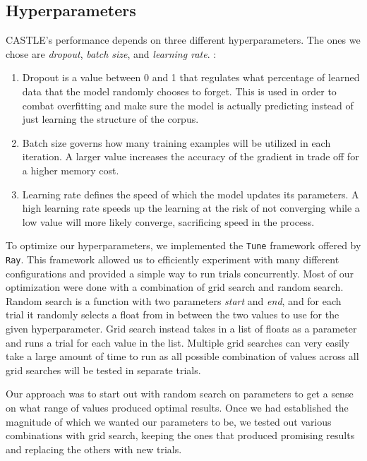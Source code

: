 \documentclass[nofilelist]{cslthse-msc}
\begin{document}
\subsection{Hyperparameters}
CASTLE's performance depends on three different hyperparameters. The ones we chose are \textit{dropout}, \textit{batch size}, and \textit{learning rate}. \citep{hyperparameters}:
\begin{enumerate}
    \item Dropout is a value between 0 and 1 that regulates what percentage of learned data that the model randomly chooses to forget. This is used in order to combat overfitting and make sure the model is actually predicting instead of just learning the structure of the corpus.
    \item  Batch size governs how many training examples will be utilized in each iteration. A larger value increases the accuracy of the gradient in trade off for a higher memory cost.
    \item  Learning rate defines the speed of which the model updates its parameters. A high learning rate speeds up the learning at the risk of not converging while a low value will more likely converge, sacrificing speed in the process.
\end{enumerate}

To optimize our hyperparameters, we implemented the \texttt{Tune} framework offered by \texttt{Ray}. This framework allowed us to efficiently experiment with many different configurations and provided a simple way to run trials concurrently. Most of our optimization were done with a combination of grid search and random search. Random search is a function with two parameters \textit{start} and \textit{end}, and for each trial it randomly selects a float from in between the two values to use for the given hyperparameter. Grid search instead takes in a list of floats as a parameter and runs a trial for each value in the list. Multiple grid searches can very easily take a large amount of time to run as all possible combination of values across all grid searches will be tested in separate trials. 

Our approach was to start out with random search on parameters to get a sense on what range of values produced optimal results. Once we had established the magnitude of which we wanted our parameters to be, we tested out various combinations with grid search, keeping the ones that produced promising results and replacing the others with new trials.
\end{document}

